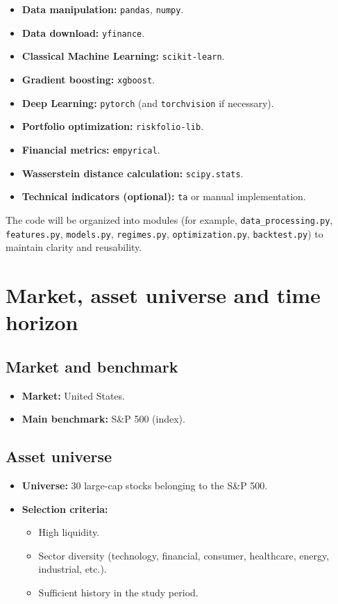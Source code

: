 \documentclass[12pt]{article}
\begin{document}
\begin{itemize}
    \item \textbf{Data manipulation:} \texttt{pandas}, \texttt{numpy}.
    \item \textbf{Data download:} \texttt{yfinance}.
    \item \textbf{Classical Machine Learning:} \texttt{scikit-learn}.
    \item \textbf{Gradient boosting:} \texttt{xgboost}.
    \item \textbf{Deep Learning:} \texttt{pytorch} (and \texttt{torchvision} if necessary).
    \item \textbf{Portfolio optimization:} \texttt{riskfolio-lib}.
    \item \textbf{Financial metrics:} \texttt{empyrical}.
    \item \textbf{Wasserstein distance calculation:} \texttt{scipy.stats}.
    \item \textbf{Technical indicators (optional):} \texttt{ta} or manual implementation.
\end{itemize}

The code will be organized into modules (for example, \texttt{data\_processing.py}, \texttt{features.py}, \texttt{models.py}, \texttt{regimes.py}, \texttt{optimization.py}, \texttt{backtest.py}) to maintain clarity and reusability.

\section{Market, asset universe and time horizon}

\subsection{Market and benchmark}

\begin{itemize}
    \item \textbf{Market:} United States.
    \item \textbf{Main benchmark:} S\&P 500 (index).
\end{itemize}

\subsection{Asset universe}

\begin{itemize}
    \item \textbf{Universe:} 30 large-cap stocks belonging to the S\&P 500.
    \item \textbf{Selection criteria:}
    \begin{itemize}
        \item High liquidity.
        \item Sector diversity (technology, financial, consumer, healthcare, energy, industrial, etc.).
        \item Sufficient history in the study period.
    \end{itemize}
\end{itemize}
\end{document}
